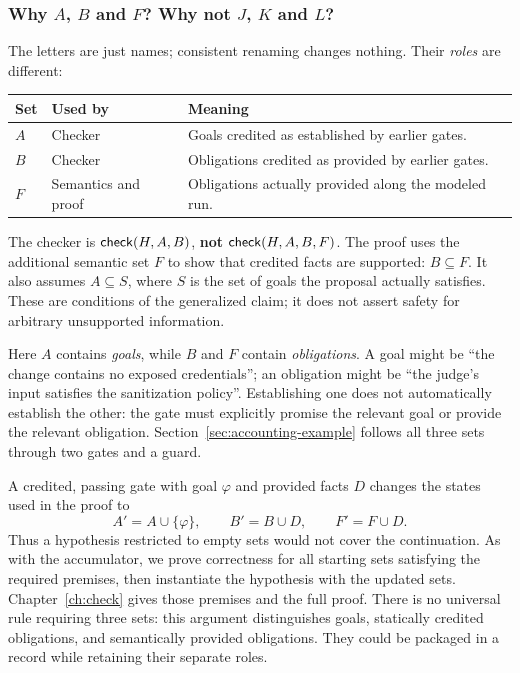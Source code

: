 \subsubsection{Why $A$, $B$ and $F$? Why not $J$, $K$ and $L$?}

The letters are just names; consistent renaming changes nothing. Their \emph{roles} are different:
\begin{center}
\begin{tabularx}{\textwidth}{@{}llX@{}}
\toprule
\textbf{Set} & \textbf{Used by} & \textbf{Meaning}\\
\midrule
$A$ & Checker & Goals credited as established by earlier gates.\\
$B$ & Checker & Obligations credited as provided by earlier gates.\\
$F$ & Semantics and proof & Obligations actually provided along the modeled run.\\
\bottomrule
\end{tabularx}
\end{center}
The checker is $\mathsf{check}(H,A,B)$, \textbf{not} $\mathsf{check}(H,A,B,F)$. The proof uses the additional semantic set $F$ to show that credited facts are supported: $B\subseteq F$. It also assumes $A\subseteq S$, where $S$ is the set of goals the proposal actually satisfies. These are conditions of the generalized claim; it does not assert safety for arbitrary unsupported information.

Here $A$ contains \emph{goals}, while $B$ and $F$ contain \emph{obligations}. A goal might be ``the change contains no exposed credentials''; an obligation might be ``the judge's input satisfies the sanitization policy''. Establishing one does not automatically establish the other: the gate must explicitly promise the relevant goal or provide the relevant obligation. Section~\ref{sec:accounting-example} follows all three sets through two gates and a guard.

A credited, passing gate with goal $\varphi$ and provided facts $D$ changes the states used in the proof to
\[
A'=A\cup\{\varphi\},\qquad B'=B\cup D,\qquad F'=F\cup D.
\]
Thus a hypothesis restricted to empty sets would not cover the continuation. As with the accumulator, we prove correctness for all starting sets satisfying the required premises, then instantiate the hypothesis with the updated sets. Chapter~\ref{ch:check} gives those premises and the full proof. There is no universal rule requiring three sets: this argument distinguishes goals, statically credited obligations, and semantically provided obligations. They could be packaged in a record while retaining their separate roles.

